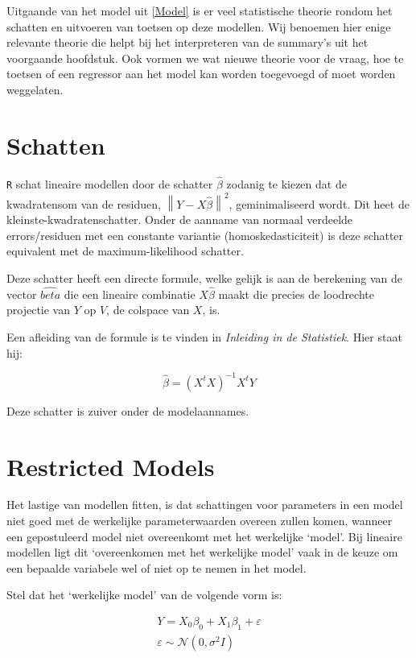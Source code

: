 \documentclass[a4paper]{report}
\newcommand{\norm}[1]{\left\lVert#1\right\rVert}
\begin{document}
  Uitgaande van het model uit \ref{Model} is er veel statistische theorie rondom het schatten en uitvoeren van toetsen op deze modellen. Wij benoemen hier enige relevante theorie die helpt bij het interpreteren van de summary's uit het voorgaande hoofdstuk. Ook vormen we wat nieuwe theorie voor de vraag, hoe te toetsen of een regressor aan het model kan worden toegevoegd of moet worden weggelaten.

\section{Schatten}
  \verb!R! schat lineaire modellen door de schatter $\hat{\beta}$ zodanig te kiezen dat de kwadratensom van de residuen, $\norm{Y-X\hat{\beta}}^2$, geminimaliseerd wordt. Dit heet de kleinste-kwadratenschatter. Onder de aanname van normaal verdeelde errors/residuen met een constante variantie (homoskedasticiteit) is deze schatter equivalent met de maximum-likelihood schatter.
  
  Deze schatter heeft een directe formule, welke gelijk is aan de berekening van de vector $\hat{beta}$ die een lineaire combinatie $X\hat{\beta}$ maakt die precies de loodrechte projectie van $Y$ op $V$, de colspace van $X$, is.
  
  Een afleiding van de formule is te vinden in \emph{Inleiding in de Statistiek}. Hier staat hij:
  
  \begin{equation}
  \label{kleinste kwadraten schatter}
  \hat{\beta} = (X^tX)^{-1}X^tY
  \end{equation}
  
  Deze schatter is zuiver onder de modelaannames.

\section{Restricted Models}

  Het lastige van modellen fitten, is dat schattingen voor parameters in een model niet goed met de werkelijke parameterwaarden overeen zullen komen, wanneer een gepostuleerd model niet overeenkomt met het werkelijke `model'. Bij lineaire modellen ligt dit `overeenkomen met het werkelijke model' vaak in de keuze om een bepaalde variabele wel of niet op te nemen in het model.
  
  Stel dat het `werkelijke model' van de volgende vorm is:
  
  \begin{align}
  Y = X_0\beta_0 + X_1\beta_1 + \varepsilon \\
  \varepsilon \sim \mathcal{N}(0,\sigma^2I)
  \end{align}
  
\end{document}
